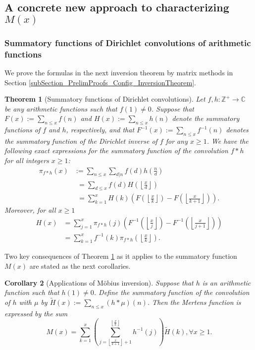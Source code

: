\documentclass[11pt,reqno,a4letter]{article}
\numberwithin{figure}{section}
\numberwithin{table}{section}
\newcommand{\floor}[1]{\left\lfloor #1 \right\rfloor}
\newcommand{\Floor}[2]{\ensuremath{\left\lfloor \frac{#1}{#2} \right\rfloor}}
\theoremstyle{plain}
\newtheorem{theorem}{Theorem}
\newtheorem{cor}[theorem]{Corollary}
\numberwithin{theorem}{section}
\theoremstyle{definition}
\begin{document}
\subsection{A concrete new approach to characterizing $M(x)$} 

\subsubsection{Summatory functions of Dirichlet convolutions of arithmetic functions} 

We prove the formulas in the next inversion theorem by matrix methods in 
Section \ref{subSection_PrelimProofs_Config_InversionTheorem}. 

\begin{theorem}[Summatory functions of Dirichlet convolutions] 
\label{theorem_SummatoryFuncsOfDirCvls} 
Let $f,h: \mathbb{Z}^{+} \rightarrow \mathbb{C}$ be any arithmetic functions such that $f(1) \neq 0$. 
Suppose that $F(x) := \sum_{n \leq x} f(n)$ and $H(x) := \sum_{n \leq x} h(n)$ denote the summatory 
functions of $f$ and $h$, respectively, and that $F^{-1}(x) := \sum_{n \leq x} f^{-1}(n)$ 
denotes the summatory function of the 
Dirichlet inverse of $f$ for any $x \geq 1$. We have the following exact expressions for the 
summatory function of the convolution $f \ast h$ for all integers $x \geq 1$: 
\begin{align*} 
\pi_{f \ast h}(x) & := \sum_{n \leq x} \sum_{d|n} f(d) h\left(\frac{n}{d}\right) \\ 
     & \phantom{:}= \sum_{d \leq x} f(d) H\left(\Floor{x}{d}\right) \\ 
     & \phantom{:}= \sum_{k=1}^{x} H(k) \left(F\left(\Floor{x}{k}\right) - 
     F\left(\Floor{x}{k+1}\right)\right). 
\end{align*} 
Moreover, for all $x \geq 1$ 
\begin{align*} 
H(x) & = \sum_{j=1}^{x} \pi_{f \ast h}(j) \left(F^{-1}\left(\Floor{x}{j}\right) - 
     F^{-1}\left(\Floor{x}{j+1}\right)\right) \\ 
     & = \sum_{k=1}^{x} f^{-1}(k) \pi_{f \ast h}\left(\Floor{x}{k}\right). 
\end{align*} 
\end{theorem} 

Two key consequences of Theorem \ref{theorem_SummatoryFuncsOfDirCvls} 
as it applies to the summatory function $M(x)$ 
are stated as the next corollaries. 

\begin{cor}[Applications of M\"obius inversion] 
\label{cor_CvlGAstMu} 
Suppose that $h$ is an arithmetic function such that 
$h(1) \neq 0$. Define the summatory function of 
the convolution of $h$ with $\mu$ by $\widetilde{H}(x) := \sum_{n \leq x} (h \ast \mu)(n)$. 
Then the Mertens function is expressed by the sum 
\[
M(x) = \sum_{k=1}^{x} \left(\sum_{j=\floor{\frac{x}{k+1}}+1}^{\floor{\frac{x}{k}}} h^{-1}(j)\right) 
     \widetilde{H}(k), \forall x \geq 1. 
\]
\end{cor} 
\end{document}
